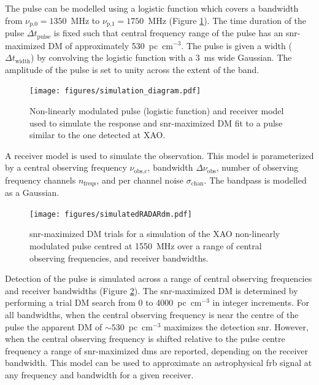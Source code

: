 \documentclass[a4paper,fleqn,usenatbib]{mnras}
\begin{document}
The pulse can be modelled using a logistic function which covers a bandwidth from
$\nu_{\textrm{p,0}} = 1350$~MHz to $\nu_{\textrm{p,1}} = 1750$~MHz (Figure
\ref{fig:xao_simulation_diagram}). The time duration of the pulse $\Delta
t_{\textrm{pulse}}$ is fixed such that central frequency range of the pulse has
an \gls{snr}-maximized DM of approximately 530~pc~cm$^{-3}$. The pulse is given
a width ($\Delta t_{\textrm{width}}$) by convolving the logistic function with a
3~ms wide Gaussian. The amplitude of the pulse is set to unity across the extent of the
band.

\begin{figure}
    \texttt{[image: figures/simulation\_diagram.pdf]}
    \caption{Non-linearly modulated pulse (logistic function) and receiver model
    used to simulate the response and \gls{snr}-maximized DM fit to a pulse
    similar to the one detected at XAO.
    }
    \label{fig:xao_simulation_diagram}
\end{figure}

A receiver model is used to simulate the observation. This model is
parameterized by a central observing frequency $\nu_{\textrm{obs,c}}$, bandwidth
$\Delta \nu_{\textrm{obs}}$, number of observing frequency channels
$n_{\textrm{freqs}}$, and per channel noise $\sigma_{\textrm{chan}}$. The
bandpass is modelled as a Gaussian.

\begin{figure}
    \texttt{[image: figures/simulatedRADARdm.pdf]}
    \caption{\gls{snr}-maximized DM trials for a simulation of the XAO
    non-linearly modulated pulse centred at 1550~MHz over a range of central
    observing frequencies, and receiver bandwidths.
    }
    \label{fig:xao_simulated_dm}
\end{figure}

Detection of the pulse is simulated across a range of central observing
frequencies and receiver bandwidths (Figure \ref{fig:xao_simulated_dm}). The
\gls{snr}-maximized DM is determined by performing a trial DM search from 0 to
4000~pc~cm$^{-3}$ in integer increments.  For all bandwidths, when the central
observing frequency is near the centre of the pulse the apparent DM of
$\sim530$~pc~cm$^{-3}$ maximizes the detection \gls{snr}. However, when the
central observing frequency is shifted relative to the pulse centre frequency a
range of \gls{snr}-maximized \glspl{dm} are reported, depending on the receiver
bandwidth. This model can be used to approximate an astrophysical \gls{frb}
signal at any frequency and bandwidth for a given receiver.
\end{document}
